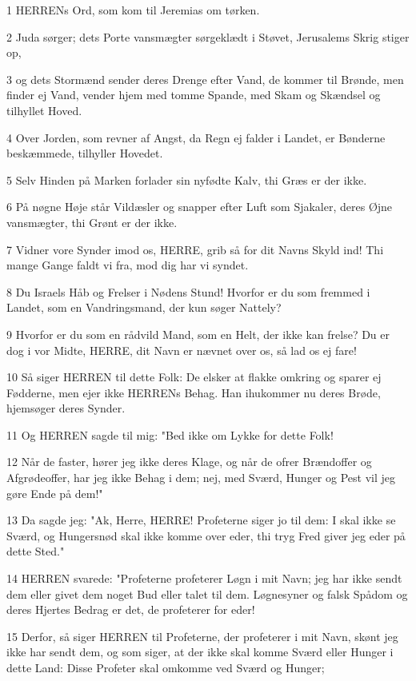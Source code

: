 \par 1 HERRENs Ord, som kom til Jeremias om tørken.
\par 2 Juda sørger; dets Porte vansmægter sørgeklædt i Støvet, Jerusalems Skrig stiger op,
\par 3 og dets Stormænd sender deres Drenge efter Vand, de kommer til Brønde, men finder ej Vand, vender hjem med tomme Spande, med Skam og Skændsel og tilhyllet Hoved.
\par 4 Over Jorden, som revner af Angst, da Regn ej falder i Landet, er Bønderne beskæmmede, tilhyller Hovedet.
\par 5 Selv Hinden på Marken forlader sin nyfødte Kalv, thi Græs er der ikke.
\par 6 På nøgne Høje står Vildæsler og snapper efter Luft som Sjakaler, deres Øjne vansmægter, thi Grønt er der ikke.
\par 7 Vidner vore Synder imod os, HERRE, grib så for dit Navns Skyld ind! Thi mange Gange faldt vi fra, mod dig har vi syndet.
\par 8 Du Israels Håb og Frelser i Nødens Stund! Hvorfor er du som fremmed i Landet, som en Vandringsmand, der kun søger Nattely?
\par 9 Hvorfor er du som en rådvild Mand, som en Helt, der ikke kan frelse? Du er dog i vor Midte, HERRE, dit Navn er nævnet over os, så lad os ej fare!
\par 10 Så siger HERREN til dette Folk: De elsker at flakke omkring og sparer ej Fødderne, men ejer ikke HERRENs Behag. Han ihukommer nu deres Brøde, hjemsøger deres Synder.
\par 11 Og HERREN sagde til mig: "Bed ikke om Lykke for dette Folk!
\par 12 Når de faster, hører jeg ikke deres Klage, og når de ofrer Brændoffer og Afgrødeoffer, har jeg ikke Behag i dem; nej, med Sværd, Hunger og Pest vil jeg gøre Ende på dem!"
\par 13 Da sagde jeg: "Ak, Herre, HERRE! Profeterne siger jo til dem: I skal ikke se Sværd, og Hungersnød skal ikke komme over eder, thi tryg Fred giver jeg eder på dette Sted."
\par 14 HERREN svarede: "Profeterne profeterer Løgn i mit Navn; jeg har ikke sendt dem eller givet dem noget Bud eller talet til dem. Løgnesyner og falsk Spådom og deres Hjertes Bedrag er det, de profeterer for eder!
\par 15 Derfor, så siger HERREN til Profeterne, der profeterer i mit Navn, skønt jeg ikke har sendt dem, og som siger, at der ikke skal komme Sværd eller Hunger i dette Land: Disse Profeter skal omkomme ved Sværd og Hunger;
